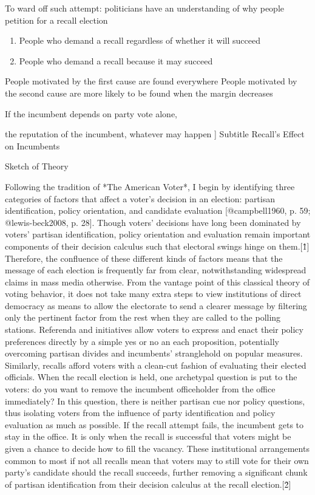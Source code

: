 \documentclass[hyphens, crop=false]{standalone}
\begin{document}
		To ward off such attempt:
		politicians have an understanding of why people petition for a recall election
		\begin{enumerate}
			\item 
			People who demand a recall regardless of whether it will succeed
			\item 
			People who demand a recall because it may succeed
		\end{enumerate}
		People motivated by the first cause are found everywhere
		People motivated by the second cause are more likely to be found when the margin decreases
		
		If the incumbent depends on party vote alone, 
		
		the reputation of the incumbent,
		whatever may happen
		]	
		Subtitle
		Recall's Effect on Incumbents

		Sketch of Theory
	
		Following the tradition of *The American Voter*,
		I begin by identifying three categories of factors that affect a voter's decision in an election:
		partisan identification, policy orientation, and candidate evaluation [@campbell1960, p. 59; @lewis-beck2008, p. 28].
		Though voters' decisions have long been dominated by voters' partisan identification,
		policy orientation and evaluation remain important components of their decision calculus such that electoral swings hinge on them.[\^1]
		Therefore,
		the confluence of these different kinds of factors means that the message of each election is frequently far from clear, notwithstanding widespread claims in mass media otherwise.
		From the vantage point of this classical theory of voting behavior,
		it does not take many extra steps to view institutions of direct democracy as means to allow the electorate to send a clearer message
		by filtering only the pertinent factor from the rest when they are called to the polling stations.
		Referenda and initiatives allow voters to express and enact their policy preferences directly by a simple yes or no an each proposition,
		potentially overcoming partisan divides and incumbents' stranglehold on popular measures.
		Similarly,
		recalls afford voters with a clean-cut fashion of evaluating their elected officials.
		When the recall election is held, one archetypal question is put to the voters:
		do you want to remove the incumbent officeholder from the office immediately?
		In this question,
		there is neither partisan cue nor policy questions,
		thus isolating voters from the influence of party identification and policy evaluation as much as possible.
		If the recall attempt fails, the incumbent gets to stay in the office.
		It is only when the recall is successful that voters might be given a chance to decide how to fill the vacancy.
		These institutional arrangements common to most if not all recalls mean that voters may to still vote for their own party's candidate should the recall succeeds,
		further removing a significant chunk of partisan identification from their decision calculus at the recall election.[\^2]
	
\end{document}
